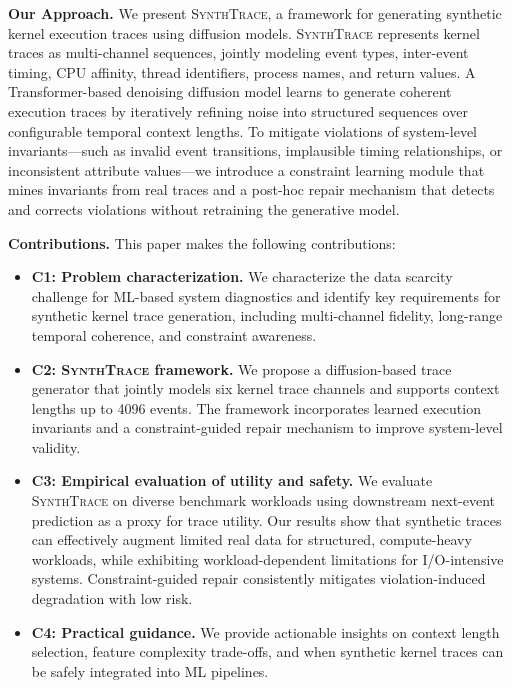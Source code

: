 \noindent\textbf{Our Approach.}
We present \textsc{SynthTrace}, a framework for generating synthetic kernel execution traces using diffusion models.
\textsc{SynthTrace} represents kernel traces as multi-channel sequences, jointly modeling event types, inter-event timing, CPU affinity, thread identifiers, process names, and return values.
A Transformer-based denoising diffusion model learns to generate coherent execution traces by iteratively refining noise into structured sequences over configurable temporal context lengths.
To mitigate violations of system-level invariants—such as invalid event transitions, implausible timing relationships, or inconsistent attribute values—we introduce a constraint learning module that mines invariants from real traces and a post-hoc repair mechanism that detects and corrects violations without retraining the generative model.

\noindent\textbf{Contributions.}
This paper makes the following contributions:

\begin{itemize}[leftmargin=*,nosep]
  \item \textbf{C1: Problem characterization.} We characterize the data scarcity challenge for ML-based system diagnostics and identify key requirements for synthetic kernel trace generation, including multi-channel fidelity, long-range temporal coherence, and constraint awareness.

  \item \textbf{C2: \textsc{SynthTrace} framework.} We propose a diffusion-based trace generator that jointly models six kernel trace channels and supports context lengths up to 4096 events. The framework incorporates learned execution invariants and a constraint-guided repair mechanism to improve system-level validity.

\item \textbf{C3: Empirical evaluation of utility and safety.}
We evaluate \textsc{SynthTrace} on diverse benchmark workloads using downstream next-event prediction as a proxy for trace utility. Our results show that synthetic traces can effectively augment limited real data for structured, compute-heavy workloads, while exhibiting workload-dependent limitations for I/O-intensive systems. Constraint-guided repair consistently mitigates violation-induced degradation with low risk.


  \item \textbf{C4: Practical guidance.} We provide actionable insights on context length selection, feature complexity trade-offs, and when synthetic kernel traces can be safely integrated into ML pipelines.
\end{itemize}

